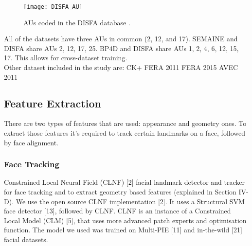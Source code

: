 \begin{figure}[H]
	\centering
	\texttt{[image: DISFA\_AU]}
	\caption{AUs coded in the DISFA database \cite{DISFA_AU}.}
	\label{fig:DISFA_AU}
\end{figure}
All of the datasets have three AUs in common (2, 12, and 17). SEMAINE and DISFA share AUs 2, 12, 17, 25. BP4D and DISFA share AUs 1, 2, 4, 6, 12, 15, 17. This allows for cross-dataset training.\\

Other dataset included in the study are:
CK+ \cite{CK+}
FERA 2011 \cite{FERA11}
FERA 2015 \cite{FERA15}
AVEC 2011 \cite{AVEC11}



\subsection{Feature Extraction}
There are two types of features that are used: appearance and geometry ones. To extract those features it's required to track certain landmarks on a face, followed by face alignment.\\

\subsubsection{Face Tracking}
Constrained Local Neural Field (CLNF) [2] facial landmark detector and tracker for face tracking and to extract geometry based features (explained in Section IV-D). We use the open source CLNF implementation [2]. It uses a Structural SVM face detector [13], followed by CLNF.
CLNF is an instance of a Constrained Local Model (CLM) [5], that uses more advanced patch experts and optimisation function. The model we used was trained on Multi-PIE [11] and in-the-wild [21] facial datasets.



